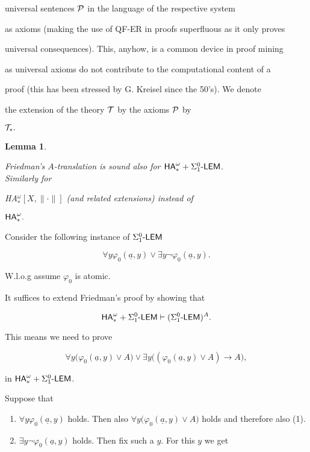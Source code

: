 \documentclass[1p]{elsarticle}
\newcommand{\usftext}[1]{\textsf{\upshape #1}}
\newcommand{\ha}{\ensuremath{{\usftext{HA}}^\omega}} %
\newcommand{\LEM}{\ensuremath{\Sigma^0_1\usftext{-LEM}}}
\newcommand{\tup}{\underline} %
\theoremstyle{plain}
\newtheorem{lemma}[thm]{Lemma}
\theoremstyle{definition}
\theoremstyle{remark}
\renewenvironment{proof}[1][]{\noindent{\bf Proof{#1}. }}{\nopagebreak[4]{\hspace*{\fill}


  $\Box$              %

 }{\vspace{2ex}}}
\renewcommand{\phi}{\varphi}
\theoremstyle{definition}
\begin{document}
{universal sentences ${\cal P}$ in the language of the respective system 

as axioms (making the use of QF-ER in proofs superfluous as it only proves 

universal consequences). This, anyhow, is a common device in proof mining 

as universal axioms do not contribute to the computational content of a 

proof (this has been stressed by G. Kreisel since the 50's). We denote 

the extension of the theory ${\cal T}$ by the axioms ${\cal P}$ by 

${\cal T}_*.$ 



\begin{lemma}\label{l:Atrans+}

Friedman's $A$-translation is sound also for $\ha_* + \LEM$.\\ Similarly for 

{\rm HA$_*^{\omega}[X,\|\cdot\|]$} (and related extensions) instead of 

$\ha_*.$

\end{lemma}

\begin{proof}

Consider the following instance of $\LEM$

\[\forall y \phi_0(\tup a,y)  \vee \exists y \neg\phi_0(\tup a,y).\] 

W.l.o.g assume $\phi_0$ is atomic. 

It suffices to extend Friedman's proof by showing that

\[\ha_* + \LEM\vdash (\LEM)^A.\]

This means we need to prove

\[ \forall y \big( \phi_0(\tup a,y) \vee A\big) \vee \exists y \big(  (\phi_0(\tup a,y) \vee A) \rightarrow A\big),\tag{1}\]

in $\ha_* + \LEM$.



Suppose that

\begin{enumerate}

\item $\forall y \phi_0(\tup a,y)$ holds. Then also $\forall y \big( \phi_0(\tup a,y) \vee A\big)$ holds and therefore also (1).

\item $\exists y \neg\phi_0(\tup a,y)$ holds. Then fix such a $y$. For this $y$ we get 


\end{enumerate}
\end{proof}}
\end{document}
